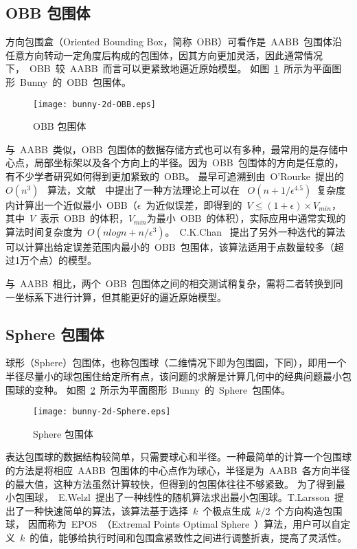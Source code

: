 \subsection{OBB 包围体}

方向包围盒（Oriented Bounding Box，简称~OBB）可看作是~AABB~包围体沿任意方向转动一定角度后构成的包围体，因其方向更加灵活，因此通常情况下，~OBB~较~AABB~而言可以更紧致地逼近原始模型。
如图~\ref{fig:obb-bunny}~所示为平面图形~Bunny~的~OBB~包围体。
\begin{figure}[htbp] %
  \centering
  \texttt{[image: bunny-2d-OBB.eps]}
  \caption{OBB 包围体}
  \label{fig:obb-bunny}
\end{figure}

与~AABB~类似，OBB~包围体的数据存储方式也可以有多种，最常用的是存储中心点，局部坐标架以及各个方向上的半径\cite{gottschalk1996obbtree}。因为~OBB~包围体的方向是任意的，有不少学者研究如何得到更加紧致的~OBB。
最早可追溯到由~O'Rourke~\cite{o1985finding}提出的~$O(n^3)$~
算法，文献~~中提出了一种方法理论上可以在~
$O(n+1/\epsilon^{4.5})$~复杂度内计算出一个近似最小~OBB（$\epsilon$~为近似误差，即得到的~$V\leq(1+\epsilon)\times V_{min}$，
其中~$V$~表示~OBB~的体积，$V_{min}$为最小~OBB~的体积），实际应用中通常实现的算法时间复杂度为~$O(nlogn+n/
\epsilon ^{3})$。~C.K.Chan~ \cite{chan2001determination}
提出了另外一种迭代的算法可以计算出给定误差范围内最小的~OBB~包围体，该算法适用于点数量较多（超过1万个点）的模型。

与~AABB~相比，两个~OBB~包围体之间的相交测试稍复杂，需将二者转换到同一坐标系下进行计算，但其能更好的逼近原始模型。

\subsection{Sphere 包围体}

球形（Sphere）包围体，也称包围球（二维情况下即为包围圆，下同），即用一个半径尽量小的球包围住给定所有点，该问题的求解是计算几何中的经典问题最小包围球的变种。
如图~\ref{fig:sphere-bunny}~所示为平面图形~Bunny~的~Sphere~包围体。
\begin{figure}[htbp] %
  \centering
  \texttt{[image: bunny-2d-Sphere.eps]}
  \caption{Sphere 包围体}
  \label{fig:sphere-bunny}
\end{figure}

表达包围球的数据结构较简单，只需要球心和半径。一种最简单的计算一个包围球的方法是将相应~AABB~包围体的中心点作为球心，半径是为~AABB~各方向半径的最大值，这种方法虽然计算较快，但得到的包围体往往不够紧致。
为了得到最小包围球，~E.Welzl~\cite{Welzl1991Smallest}提出了一种线性的随机算法求出最小包围球。T.Larsson~\cite{larsson2008fast}提出了一种快速简单的算法，该算法基于选择~$k$~个极点生成~$k/2$~个方向构造包围球，
因而称为~EPOS~（Extremal Points Optimal Sphere~）算法，用户可以自定义~$k$~的值，能够给执行时间和包围盒紧致性之间进行调整折衷，提高了灵活性。

